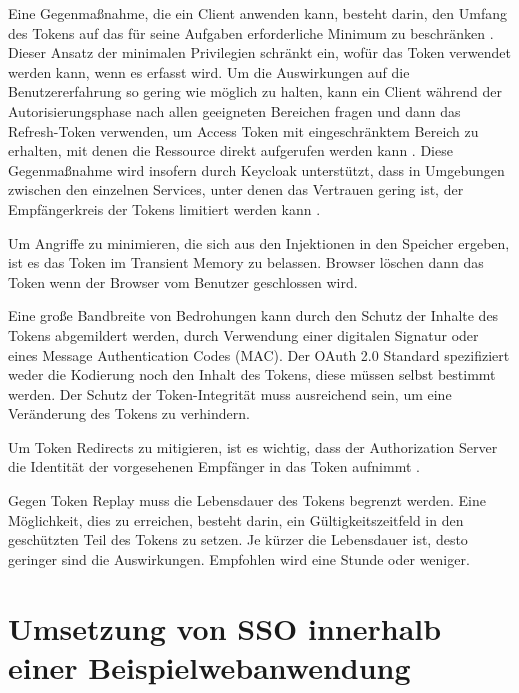 Eine Gegenmaßnahme, die ein Client anwenden kann, besteht darin, den Umfang des Tokens auf das für seine Aufgaben erforderliche Minimum zu beschränken \cite{OAuthAuthorizationSecurityConsiderations}. Dieser Ansatz der minimalen Privilegien schränkt ein, wofür das Token verwendet werden kann, wenn es erfasst wird. Um die Auswirkungen auf die Benutzererfahrung so gering wie möglich zu halten, kann ein Client während der Autorisierungsphase nach allen geeigneten Bereichen fragen und dann das Refresh-Token verwenden, um Access Token mit eingeschränktem Bereich zu erhalten, mit denen die Ressource direkt aufgerufen werden kann \cite{OAuthAuthorizationSecurityConsiderations}. Diese Gegenmaßnahme wird insofern durch Keycloak unterstützt, dass in Umgebungen zwischen den einzelnen Services, unter denen das Vertrauen gering ist, der Empfängerkreis der Tokens limitiert werden kann \cite{keycloakDocs}. 

Um Angriffe zu minimieren, die sich aus den Injektionen in den Speicher ergeben, ist es das Token im Transient Memory zu belassen. Browser löschen dann das Token wenn der Browser vom Benutzer geschlossen wird.

Eine große Bandbreite von Bedrohungen kann durch den Schutz der Inhalte des Tokens abgemildert werden, durch Verwendung einer digitalen Signatur oder eines Message Authentication Codes (MAC). Der OAuth 2.0 Standard spezifiziert weder die Kodierung noch den Inhalt des Tokens, diese müssen selbst bestimmt werden. Der Schutz der Token-Integrität muss ausreichend sein, um eine Veränderung des Tokens zu verhindern. \cite{RFC6750}

Um Token Redirects zu mitigieren, ist es wichtig, dass der Authorization Server die Identität der vorgesehenen Empfänger in das Token aufnimmt \cite{RFC6750}.

Gegen Token Replay muss die Lebensdauer des Tokens begrenzt werden. Eine Möglichkeit, dies zu erreichen, besteht darin, ein Gültigkeitszeitfeld in den geschützten Teil des Tokens zu setzen. Je kürzer die Lebensdauer ist, desto geringer sind die Auswirkungen. Empfohlen wird eine Stunde oder weniger. \cite{RFC6750}


\section{Umsetzung von SSO innerhalb einer Beispielwebanwendung} \label{EB_Beispielwebanwendung}

